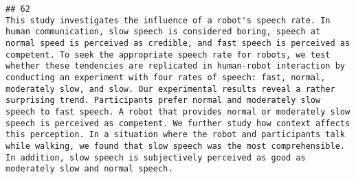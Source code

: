 \documentclass[
  english,
  man]{apa6}
\begin{document}
\begin{verbatim}
## 62                                                                                                                                                                                                                                                                                                                                                                                                                                                                                                                                                                                                                                                                                                                                                                                                                                                                                                                                                                                                                                                                                                                                                                                                                                                                                                                                                                                                                                                                                                                                                                                                                                                                                                                     This study investigates the influence of a robot's speech rate. In human communication, slow speech is considered boring, speech at normal speed is perceived as credible, and fast speech is perceived as competent. To seek the appropriate speech rate for robots, we test whether these tendencies are replicated in human-robot interaction by conducting an experiment with four rates of speech: fast, normal, moderately slow, and slow. Our experimental results reveal a rather surprising trend. Participants prefer normal and moderately slow speech to fast speech. A robot that provides normal or moderately slow speech is perceived as competent. We further study how context affects this perception. In a situation where the robot and participants talk while walking, we found that slow speech was the most comprehensible. In addition, slow speech is subjectively perceived as good as moderately slow and normal speech.

\end{verbatim}
\end{document}
